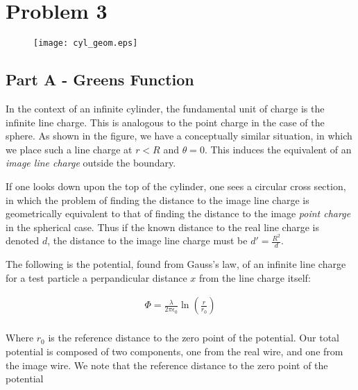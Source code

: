 \documentclass[paper=a4, fontsize=11pt]{scrartcl} %
\numberwithin{equation}{section} %
\numberwithin{figure}{section} %
\numberwithin{table}{section} %
\begin{document}
\section{Problem 3}

\begin{figure}[H]
\begin{center}
\texttt{[image: cyl\_geom.eps]}
\end{center}
\end{figure}

\subsection{Part A - Greens Function}

In the context of an infinite cylinder, the fundamental unit of charge is the infinite line charge. This is analogous to the point charge in the case of the sphere. As shown in the figure, we have a conceptually similar situation, in which we place such a line charge at $r<R$ and $\theta = 0$. This induces the equivalent of an \textit{image line charge} outside the boundary. 

\hspace{2mm}

If one looks down upon the top of the cylinder, one sees a circular cross section, in which the problem of finding the distance to the image line charge is geometrically equivalent to that of finding the distance to the image \textit{point charge} in the spherical case. Thus if the known distance to the real line charge is denoted $d$, the distance to the image line charge must be $d' = \frac{R^2}{d}$.

\hspace{2mm}

The following is the potential, found from Gauss's law, of an infinite line charge for a test particle a perpandicular distance $x$ from the line charge itself:

\begin{align}
\Phi = \frac{\lambda}{2 \pi \epsilon_0}\ln\left(\frac{r}{r_0}\right) \\
\end{align}

Where $r_0$ is the reference distance to the zero point of the potential. Our total potential is composed of two components, one from the real wire, and one from the image wire. We note that the reference distance to the zero point of the potential  
\end{document}
